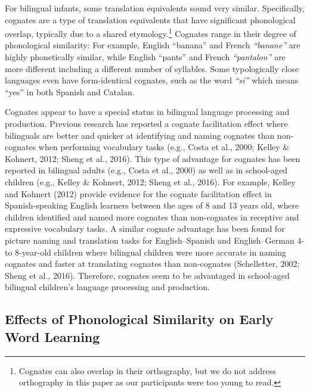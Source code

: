 \documentclass[
  english,
  ,man,floatsintext]{apa6}
\begin{document}
For bilingual infants, some translation equivalents sound very similar. Specifically, cognates are a type of translation equivalents that have significant phonological overlap, typically due to a shared etymology.\footnote{Cognates can also overlap in their orthography, but we do not address orthography in this paper as our participants were too young to read.} Cognates range in their degree of phonological similarity: For example, English ``banana''  and French \emph{``banane''}  are highly phonetically similar, while English ``pants''  and French \emph{``pantalon''}  are more different including a different number of syllables. Some typologically close languages even have form-identical cognates, such as the word \emph{``sí''}  which means ``yes'' in both Spanish and Catalan.

Cognates appear to have a special status in bilingual language processing and production. Previous research has reported a cognate facilitation effect where bilinguals are better and quicker at identifying and naming cognates than non-cognates when performing vocabulary tasks (e.g., Costa et al., 2000; Kelley \& Kohnert, 2012; Sheng et al., 2016). This type of advantage for cognates has been reported in bilingual adults (e.g., Costa et al., 2000) as well as in school-aged children (e.g., Kelley \& Kohnert, 2012; Sheng et al., 2016). For example, Kelley and Kohnert (2012) provide evidence for the cognate facilitation effect in Spanish-speaking English learners between the ages of 8 and 13 years old, where children identified and named more cognates than non-cognates in receptive and expressive vocabulary tasks. A similar cognate advantage has been found for picture naming and translation tasks for English--Spanish and English--German 4- to 8-year-old children where bilingual children were more accurate in naming cognates and faster at translating cognates than non-cognates (Schelletter, 2002; Sheng et al., 2016). Therefore, cognates seem to be advantaged in school-aged bilingual children's language processing and production.

\hypertarget{effects-of-phonological-similarity-on-early-word-learning}{%
\subsection{Effects of Phonological Similarity on Early Word Learning}\label{effects-of-phonological-similarity-on-early-word-learning}}
\end{document}
